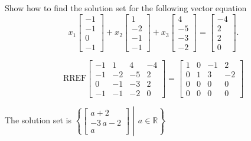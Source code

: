 
\begin{exerciseStatement}


Show how to find the solution set for the following vector equation \[ x_{1} \left[\begin{array}{c}
-1 \\
-1 \\
0 \\
-1
\end{array}\right] + x_{2} \left[\begin{array}{c}
1 \\
-2 \\
-1 \\
-1
\end{array}\right] + x_{3} \left[\begin{array}{c}
4 \\
-5 \\
-3 \\
-2
\end{array}\right] = \left[\begin{array}{c}
-4 \\
2 \\
2 \\
0
\end{array}\right] .\]


\end{exerciseStatement}
    
\begin{exerciseAnswer} 
\[\mathrm{RREF} \left[\begin{array}{ccc|c}
-1 & 1 & 4 & -4 \\
-1 & -2 & -5 & 2 \\
0 & -1 & -3 & 2 \\
-1 & -1 & -2 & 0
\end{array}\right]  =  \left[\begin{array}{ccc|c}
1 & 0 & -1 & 2 \\
0 & 1 & 3 & -2 \\
0 & 0 & 0 & 0 \\
0 & 0 & 0 & 0
\end{array}\right] \]

The solution set is \( \left\{ \left[\begin{array}{c}
a + 2 \\
-3 \, a - 2 \\
a
\end{array}\right] \middle|\,a\in\mathbb{R}\right\} \)


\end{exerciseAnswer}
    
